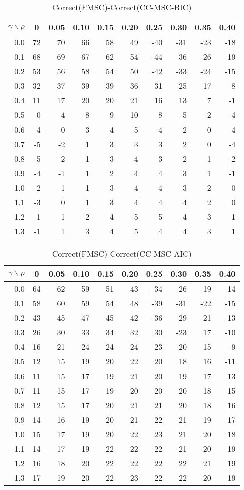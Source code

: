 \documentclass[12pt]{article}
\begin{document}
%
\begin{table}[!tbp]
\caption{Correct(FMSC)-Correct(CC-MSC-BIC)}
 \begin{center}
 \begin{tabular}{r|rrrrrrrrr}\hline\hline
\multicolumn{1}{c|}{$\gamma\backslash\rho$}&\multicolumn{1}{c}{0}&\multicolumn{1}{c}{0.05}&\multicolumn{1}{c}{0.10}&\multicolumn{1}{c}{0.15}&\multicolumn{1}{c}{0.20}&\multicolumn{1}{c}{0.25}&\multicolumn{1}{c}{0.30}&\multicolumn{1}{c}{0.35}&\multicolumn{1}{c}{0.40}\tabularnewline
\hline
0.0&72&70&66&58&49&-40&-31&-23&-18\tabularnewline
0.1&68&69&67&62&54&-44&-36&-26&-19\tabularnewline
0.2&53&56&58&54&50&-42&-33&-24&-15\tabularnewline
0.3&32&37&39&39&36& 31&-25& 17& -8\tabularnewline
0.4&11&17&20&20&21& 16& 13&  7& -1\tabularnewline
0.5& 0& 4& 8& 9&10&  8&  5&  2&  4\tabularnewline
0.6&-4& 0& 3& 4& 5&  4&  2&  0& -4\tabularnewline
0.7&-5&-2& 1& 3& 3&  3&  2&  0& -4\tabularnewline
0.8&-5&-2& 1& 3& 4&  3&  2&  1& -2\tabularnewline
0.9&-4&-1& 1& 2& 4&  4&  3&  1& -1\tabularnewline
1.0&-2&-1& 1& 3& 4&  4&  3&  2&  0\tabularnewline
1.1&-3& 0& 1& 3& 4&  4&  4&  2&  0\tabularnewline
1.2&-1& 1& 2& 4& 5&  5&  4&  3&  1\tabularnewline
1.3&-1& 1& 3& 4& 5&  4&  4&  3&  1\tabularnewline
\hline
\end{tabular}

\end{center}

\end{table}

%
\begin{table}[!tbp]
\caption{Correct(FMSC)-Correct(CC-MSC-AIC)}
 \begin{center}
 \begin{tabular}{r|rrrrrrrrr}\hline\hline
\multicolumn{1}{c|}{$\gamma\backslash\rho$}&\multicolumn{1}{c}{0}&\multicolumn{1}{c}{0.05}&\multicolumn{1}{c}{0.10}&\multicolumn{1}{c}{0.15}&\multicolumn{1}{c}{0.20}&\multicolumn{1}{c}{0.25}&\multicolumn{1}{c}{0.30}&\multicolumn{1}{c}{0.35}&\multicolumn{1}{c}{0.40}\tabularnewline
\hline
0.0&64&62&59&51&43&-34&-26&-19&-14\tabularnewline
0.1&58&60&59&54&48&-39&-31&-22&-15\tabularnewline
0.2&43&45&47&45&42&-36&-29&-21&-13\tabularnewline
0.3&26&30&33&34&32& 30&-23& 17&-10\tabularnewline
0.4&16&21&24&24&24& 23& 20& 15& -9\tabularnewline
0.5&12&15&19&20&22& 20& 18& 16&-11\tabularnewline
0.6&11&15&17&19&21& 20& 19& 17& 13\tabularnewline
0.7&11&15&17&19&20& 20& 20& 18& 15\tabularnewline
0.8&12&15&17&20&21& 21& 20& 18& 16\tabularnewline
0.9&14&16&19&20&21& 22& 21& 19& 17\tabularnewline
1.0&15&17&19&20&22& 23& 21& 20& 18\tabularnewline
1.1&14&17&19&22&22& 22& 21& 20& 19\tabularnewline
1.2&16&18&20&22&22& 22& 22& 21& 19\tabularnewline
1.3&17&19&20&22&23& 22& 22& 20& 19\tabularnewline
\hline
\end{tabular}

\end{center}

\end{table}
\end{document}
